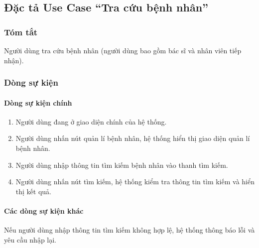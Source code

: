 \subsection{Đặc tả Use Case ``Tra cứu bệnh nhân''}

\subsubsection{Tóm tắt}
Người dùng tra cứu bệnh nhân (người dùng bao gồm bác sĩ và nhân viên tiếp nhận).

\subsubsection{Dòng sự kiện}
\paragraph{\textbf{Dòng sự kiện chính}}
\begin{enumerate}
  \item Người dùng đang ở giao diện chính của hệ thống.
  \item Người dùng nhấn nút quản lí bệnh nhân, hệ thống hiển thị giao diện quản lí bệnh nhân.
  \item Người dùng nhập thông tin tìm kiếm bệnh nhân vào thanh tìm kiếm.
  \item Người dùng nhấn nút tìm kiếm, hệ thống kiểm tra thông tin tìm kiếm và hiển thị kết quả.
\end{enumerate}

\paragraph{\textbf{Các dòng sự kiện khác}}
Nếu người dùng nhập thông tin tìm kiếm không hợp lệ, hệ thống thông báo lỗi và yêu cầu nhập lại.

